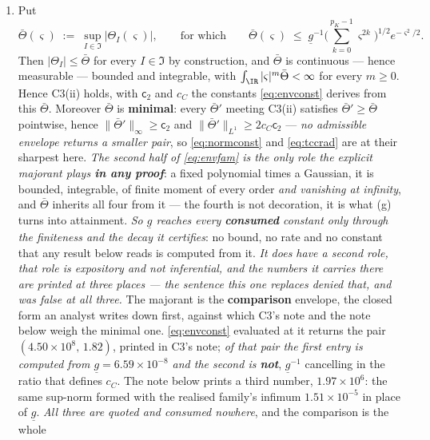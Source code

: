 \begin{lemma}
\begin{enumerate}
metrisable for it; and $\underline g:=\inf_{I\in\mathfrak I}\lambda_{\min}\big(\mathsf G(I)\big)>0$.
\item[(d)] Put
\begin{equation}\label{eq:envfam}
\bar\Theta(\varsigma)\;:=\;\sup_{I\in\mathfrak I}\big|\Theta_I(\varsigma)\big| ,
\qquad\text{for which}\qquad
\bar\Theta(\varsigma)\;\le\;\underline g^{-1}\Big(\sum_{k=0}^{p_K-1}\varsigma^{2k}\Big)^{1/2}e^{-\varsigma^{2}/2} .
\end{equation}
Then $|\Theta_I|\le\bar\Theta$ for every $I\in\mathfrak I$ by construction, and $\bar\Theta$ is
continuous --- hence measurable --- bounded and integrable, with $\int_\IR|\varsigma|^{m}\bar\Theta<\infty$
for every $m\ge0$. Hence C3(ii) holds, with $\mathsf c_2$ and $c_C$ the constants \eqref{eq:envconst}
derives from this $\bar\Theta$. Moreover $\bar\Theta$ is \textbf{minimal}: every $\bar\Theta'$ meeting
C3(ii) satisfies $\bar\Theta'\ge\bar\Theta$ pointwise, hence $\|\bar\Theta'\|_\infty\ge\mathsf c_2$ and
$\|\bar\Theta'\|_{L^{1}}\ge2c_C\mathsf c_2$ --- \emph{no admissible envelope returns a smaller pair}, so
\eqref{eq:normconst} and \eqref{eq:tccrad} are at their sharpest here. \emph{The second half of \eqref{eq:envfam} is the
only role the explicit majorant plays \textbf{in any proof}}: a fixed polynomial times a Gaussian, it is
bounded, integrable, of finite moment of every order \emph{and vanishing at infinity}, and $\bar\Theta$
inherits all four from it --- the fourth is not decoration, it is what \textup{(g)} turns into
attainment. \emph{So $\underline g$ reaches every \textbf{consumed} constant only through the finiteness
and the decay it certifies}: no bound, no rate and no constant that any result below reads is computed
from it.
\emph{It does have a second role, that role is expository and not inferential, and the numbers it carries
there are printed at three places --- the sentence this one replaces denied that, and was false at all
three.} The majorant is the \textbf{comparison} envelope, the closed form an analyst writes down first,
against which C3's note and the note below weigh the minimal one. \eqref{eq:envconst} evaluated at it
returns the pair $(4.50\times10^{8},\,1.82)$, printed in C3's note; \emph{of that pair the first entry is
computed from $\underline g=6.59\times10^{-8}$ and the second is \textbf{not}}, $\underline g^{-1}$
cancelling in the ratio that defines $c_C$. The note below prints a third number,
$1.97\times10^{6}$: the same sup-norm formed with the realised family's infimum $1.51\times10^{-5}$ in
place of $\underline g$. \emph{All three are quoted and consumed nowhere}, and the comparison is the whole

\end{enumerate}
\end{lemma}
